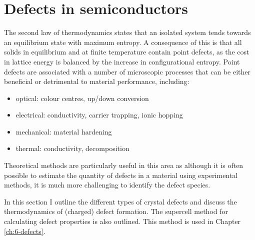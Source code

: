 \section{Defects in semiconductors}

The second law of thermodynamics states that an isolated system tends towards an equilibrium state with maximum entropy. A consequence of this is that all solids in equilibrium and at finite temperature contain point defects, as the cost in lattice energy is balanced by the increase in configurational entropy. 
Point defects are associated with a number of microscopic processes that can be either beneficial or detrimental to material performance, including:
\begin{itemize}[noitemsep]
    \item optical: colour centres, up/down conversion
    \item electrical: conductivity, carrier trapping, ionic hopping
    \item mechanical: material hardening
    \item thermal: conductivity, decomposition
\end{itemize}
Theoretical methods are particularly useful in this area as although it is often possible to estimate the quantity of defects in a material using experimental methods, it is much more challenging to identify the defect species.\autocite{Alkauskas2016}  
 
In this section I outline the different types of crystal defects and discuss the thermodynamics of (charged) defect formation. The supercell method for calculating defect properties is also outlined. This method is used in Chapter \ref{ch:6-defects}.




